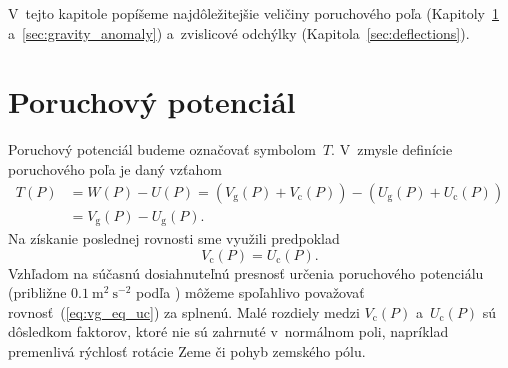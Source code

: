 \documentclass[a4paper, 12pt]{book}
\newcommand{\gidx}{\mathrm g}
\newcommand{\cidx}{\mathrm c}
\begin{document}
V~tejto kapitole popíšeme najdôležitejšie veličiny poruchového poľa 
(Kapitoly~\ref{sec:disturbing_potential} a~\ref{sec:gravity_anomaly}) 
a~zvislicové odchýlky (Kapitola~\ref{sec:deflections}).






\section{Poruchový potenciál}
\label{sec:disturbing_potential}

Poruchový potenciál budeme označovať symbolom~$T$.  V~zmysle definície 
poruchového poľa je daný vzťahom
%
\begin{equation}
\label{eq:disturbing_potential}
\begin{split}
T(P) &= W(P) - U(P) = (V_\gidx(P) + V_\cidx(P)) - (U_\gidx(P) + U_\cidx(P))\\
%
&= V_\gidx(P) - U_\gidx(P){.}
\end{split}
\end{equation}
%
Na získanie poslednej rovnosti sme využili predpoklad
%
\begin{equation}
\label{eq:vg_eq_uc}
V_\cidx(P) = U_\cidx(P){.}
\end{equation}
%
Vzhľadom na súčasnú dosiahnuteľnú presnosť určenia poruchového potenciálu 
(približne $0.1\ \mathrm{m}^2 \ \mathrm{s}^{-2}$ podľa 
\cite{SansoGeoidDetermination}) môžeme spoľahlivo považovať 
rovnosť~(\ref{eq:vg_eq_uc}) za splnenú.  Malé rozdiely medzi $V_\cidx(P)$ 
a~$U_\cidx(P)$ sú dôsledkom faktorov, ktoré nie sú zahrnuté v~normálnom poli, 
napríklad premenlivá rýchlosť rotácie Zeme či pohyb zemského pólu.
\end{document}

